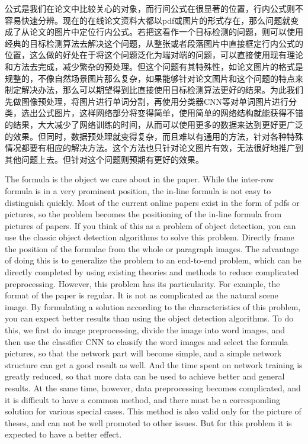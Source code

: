 
\begin{cabstract}
	公式是我们在论文中比较关心的对象，而行间公式在很显著的位置，行内公式则不容易快速分辨。现在的在线论文资料大都以pdf或图片的形式存在，那么问题就变成了从论文的图片中定位行内公式。若把这看作一个目标检测的问题，则可以使用经典的目标检测算法去解决这个问题，从整张或者段落图片中直接框定行内公式的位置，这么做的好处在于将这个问题泛化为端对端的问题，可以直接使用现有理论和方法去完成，减少繁杂的预处理。但这个问题有其特殊性，如论文图片的格式是规整的，不像自然场景图片那么复杂，如果能够针对论文图片和这个问题的特点来制定解决办法，那么可以期望得到比直接使用目标检测算法更好的结果。为此我们先做图像预处理，将图片进行单词分割，再使用分类器CNN等对单词图片进行分类，选出公式图片，这样网络部分将变得简单，使用简单的网络结构就能获得不错的结果，大大减少了网络训练的时间，从而可以使用更多的数据来达到更好更广泛的效果。但同时，数据预处理就变得复杂，而且难以有通用的方法，针对各种特殊情况都要有相应的解决方法。这个方法也只针对论文图片有效，无法很好地推广到其他问题上去。但针对这个问题则预期有更好的效果。
\end{cabstract}

\begin{eabstract}
	The formula is the object we care about in the paper. While the inter-row formula is in a very prominent position, the in-line formula is not easy to distinguish quickly. Most of the current online papers exist in the form of pdfs or pictures, so the problem becomes the positioning of the in-line formula from pictures of papers. If you think of this as a problem of object detection, you can use the classic object detection algorithms to solve this problem. Directly frame the position of the formulae from the whole or paragraph images. The advantage of doing this is to generalize the problem to an end-to-end problem, which can be directly completed by using existing theories and methods to reduce complicated preprocessing. However, this problem has its particularity. For example, the format of the paper is regular. It is not as complicated as the natural scene image. By formulating a solution according to the characteristics of this problem, you can expect better results than using the object detection algorithms. To do this, we first do image preprocessing, divide the image into word images, and then use the classifier CNN to classify the word images and select the formula pictures, so that the network part will become simple, and a simple network structure can get a good result as well. And the time spent on network training is greatly reduced, so that more data can be used to achieve better and general results. At the same time, however, data preprocessing becomes complicated, and it is difficult to have a common method, and there must be a corresponding solution for various special cases. This method is also valid only for the picture of theses, and can not be well promoted to other issues. But for this problem it is expected to have a better effect.
\end{eabstract}
